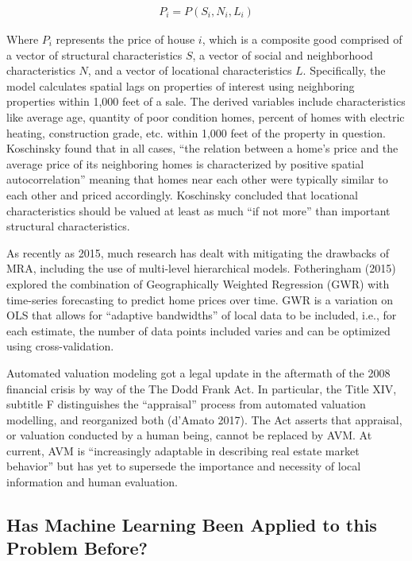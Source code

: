 \documentclass[]{article}
\begin{document}
\[
\begin{aligned}
 P_i = P(S_i, N_i, L_i)
\end{aligned}
\]

Where \(P_i\) represents the price of house \(i\), which is a composite
good comprised of a vector of structural characteristics \(S\), a vector
of social and neighborhood characteristics \(N\), and a vector of
locational characteristics \(L\). Specifically, the model calculates
spatial lags on properties of interest using neighboring properties
within 1,000 feet of a sale. The derived variables include
characteristics like average age, quantity of poor condition homes,
percent of homes with electric heating, construction grade, etc. within
1,000 feet of the property in question. Koschinsky found that in all
cases, ``the relation between a home's price and the average price of
its neighboring homes is characterized by positive spatial
autocorrelation'' meaning that homes near each other were typically
similar to each other and priced accordingly. Koschinsky concluded that
locational characteristics should be valued at least as much ``if not
more'' than important structural characteristics.

As recently as 2015, much research has dealt with mitigating the
drawbacks of MRA, including the use of multi-level hierarchical models.
Fotheringham (2015) explored the combination of Geographically Weighted
Regression (GWR) with time-series forecasting to predict home prices
over time. GWR is a variation on OLS that allows for ``adaptive
bandwidths'' of local data to be included, i.e., for each estimate, the
number of data points included varies and can be optimized using
cross-validation.

Automated valuation modeling got a legal update in the aftermath of the
2008 financial crisis by way of the The Dodd Frank Act. In particular,
the Title XIV, subtitle F distinguishes the ``appraisal'' process from
automated valuation modelling, and reorganized both (d'Amato 2017). The
Act asserts that appraisal, or valuation conducted by a human being,
cannot be replaced by AVM. At current, AVM is ``increasingly adaptable
in describing real estate market behavior'' but has yet to supersede the
importance and necessity of local information and human evaluation.

\subsection{Has Machine Learning Been Applied to this Problem
Before?}\label{has-machine-learning-been-applied-to-this-problem-before}
\end{document}
